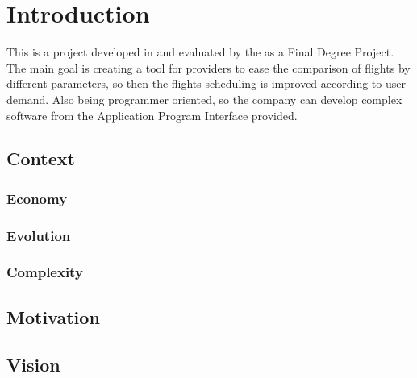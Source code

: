 
\chapter{Introduction}

\label{chapter01}

This is a project developed in \textit{\company} and evaluated by the \textit{\univname} as a Final Degree Project. The main goal is creating a tool for \textit{\company} providers to ease the comparison of flights by different parameters, so then the flights scheduling is improved according to user demand. Also being programmer oriented, so the company can develop complex software from the Application Program Interface provided.

\section{Context}

\subsection{Economy}

\subsection{Evolution}

\subsection{Complexity}

\section{Motivation}

\section{Vision}